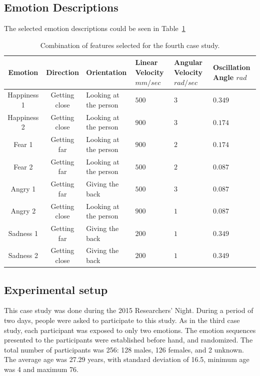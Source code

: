 \subsection{Emotion Descriptions} 

The selected emotion descriptions could be seen in Table~\ref{table:features_2}
\begin{table}[tbh]
\begin{center}
\caption{Combination of features selected for the fourth case study.}
\label{table:features_2}
\small
\begin{tabular}{|c|c|p{2.5 cm}|p{2 cm}|p{2 cm}|p{2.5cm}|}
\hline 
\textbf{Emotion} & \textbf{Direction} & \textbf{Orientation} & \textbf{Linear Velocity} $mm/sec$& \textbf{Angular Velocity} $rad/sec$& \textbf{Oscillation Angle} $rad$\\
\hline
Happiness 1 & Getting close & Looking at the person & $500$  & $3$ & $0.349$ \\
\hline
Happiness 2 & Getting close & Looking at the person & $900$ & $3$ & $0.174$ \\
\hline
Fear 1 & Getting far & Looking at the person & $900$ & $2$ & $0.174$ \\
\hline
Fear 2 & Getting far & Looking at the person & $500$ & $2$ & $0.087$ \\
\hline
Angry 1 & Getting far & Giving the back & $500$ & $3$ & $0.087$ \\
\hline
Angry 2 & Getting close & Looking at the person & $900$ & $1$ & $0.087$ \\
\hline
Sadness 1 & Getting far & Giving the back & $200$ & $1$ & $0.349$ \\
\hline
Sadness 2 & Getting close & Giving the back & $200$ & $1$  & $0.349$ \\
\hline
\end{tabular}
\end{center}
\end{table} 

\subsection{Experimental setup}

This case study was done during the 2015 Researchers' Night. During a period of two days, people were asked to participate to this study. As in the third case study, each participant was exposed to only two emotions. The emotion sequences presented to the participants were established before hand, and randomized. The total number of participants was 256: 128 males, 126 females, and 2 unknown. The average age was 27.29 years, with standard deviation of 16.5, minimum age was 4 and maximum 76. 

